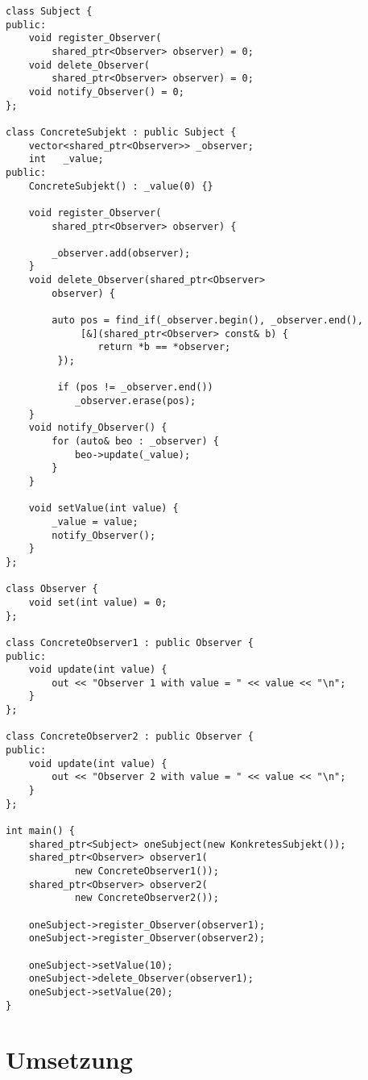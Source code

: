 \begin{lstlisting}
class Subject {
public:
    void register_Observer(
    	shared_ptr<Observer> observer) = 0;
    void delete_Observer(
    	shared_ptr<Observer> observer) = 0;
    void notify_Observer() = 0;
};
 
class ConcreteSubjekt : public Subject {
    vector<shared_ptr<Observer>> _observer;
    int   _value;
public:
    ConcreteSubjekt() : _value(0) {}
 
    void register_Observer(
    	shared_ptr<Observer> observer) {
    	
        _observer.add(observer);
    }
    void delete_Observer(shared_ptr<Observer>
    	observer) {
    	
        auto pos = find_if(_observer.begin(), _observer.end(),
        	 [&](shared_ptr<Observer> const& b) { 
        	 	return *b == *observer;
         });
          
         if (pos != _observer.end()) 
         	_observer.erase(pos);
    }
    void notify_Observer() {
        for (auto& beo : _observer) {
            beo->update(_value);
        }
    }
 
    void setValue(int value) {
        _value = value;
        notify_Observer();
    }
};
 
class Observer {
    void set(int value) = 0;
};
 
class ConcreteObserver1 : public Observer {
public:
    void update(int value) {
        out << "Observer 1 with value = " << value << "\n";
    }
};
 
class ConcreteObserver2 : public Observer {
public:
    void update(int value) {
        out << "Observer 2 with value = " << value << "\n";
    }
};
 
int main() {
    shared_ptr<Subject> oneSubject(new KonkretesSubjekt());
    shared_ptr<Observer> observer1(
    		new ConcreteObserver1());
    shared_ptr<Observer> observer2(
    		new ConcreteObserver2());
 
    oneSubject->register_Observer(observer1);
    oneSubject->register_Observer(observer2);
 
    oneSubject->setValue(10);
    oneSubject->delete_Observer(observer1);
    oneSubject->setValue(20);
}
\end{lstlisting}

\section{Umsetzung}

